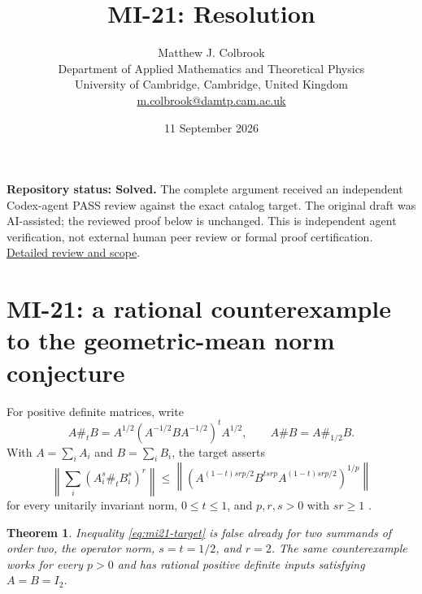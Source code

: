 \documentclass[10pt,a4paper]{article}
\title{MI-21: Resolution}
\author{Matthew J. Colbrook\\
\small Department of Applied Mathematics and Theoretical Physics\\
\small University of Cambridge, Cambridge, United Kingdom\\
\small\href{mailto:m.colbrook@damtp.cam.ac.uk}{m.colbrook@damtp.cam.ac.uk}}
\date{11 September 2026}
\newtheorem{theorem}{Theorem}[section]
\theoremstyle{remark}
\begin{document}
\maketitle
\textbf{Repository status: Solved.}
The complete argument received an independent Codex-agent PASS review
against the exact catalog target.
The original draft was AI-assisted; the reviewed proof below is unchanged.
This is independent agent verification, not external human peer review or
formal proof certification. \href{https://github.com/ajt60gaibb/OpenProblemsInNLA/blob/main/references/colbrook-matrix-2026-09-11/verification/reviews/MI-21-review.md}{Detailed review and scope}.
\par\medskip
\section{MI-21: a rational counterexample to the geometric-mean norm conjecture}
\label{sec:mi21}

For positive definite matrices, write
\[
 A\#_tB=A^{1/2}(A^{-1/2}BA^{-1/2})^tA^{1/2},\qquad A\#B=A\#_{1/2}B.
\]
With $A=\sum_iA_i$ and $B=\sum_iB_i$, the target asserts
\begin{equation}\label{eq:mi21-target}
 \left\|\sum_i(A_i^s\#_tB_i^s)^r\right\|
 \leq
 \left\|\left(A^{(1-t)srp/2}B^{tsrp}A^{(1-t)srp/2}\right)^{1/p}\right\|
\end{equation}
for every unitarily invariant norm, $0\leq t\leq1$, and $p,r,s>0$ with $sr\geq1$ \cite[Conjecture 3]{FH2024}.

\begin{theorem}\label{thm:mi21}
Inequality \eqref{eq:mi21-target} is false already for two summands of order two, the operator norm, $s=t=1/2$, and $r=2$. The same counterexample works for every $p>0$ and has rational positive definite inputs satisfying $A=B=I_2$.
\end{theorem}
\end{document}
